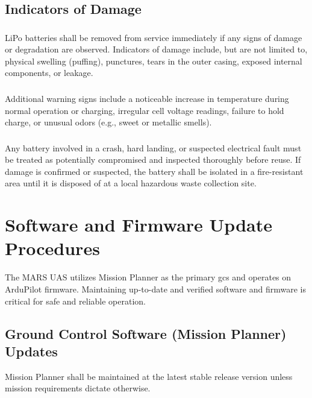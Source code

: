     \subsection{Indicators of Damage}
    \subsubsection{} LiPo batteries shall be removed from service immediately if any signs of damage or degradation are observed. Indicators of damage include, but are not limited to, physical swelling (puffing), punctures, tears in the outer casing, exposed internal components, or leakage.
    
    \subsubsection{} Additional warning signs include a noticeable increase in temperature during normal operation or charging, irregular cell voltage readings, failure to hold charge, or unusual odors (e.g., sweet or metallic smells).
    
    \subsubsection{} Any battery involved in a crash, hard landing, or suspected electrical fault must be treated as potentially compromised and inspected thoroughly before reuse. If damage is confirmed or suspected, the battery shall be isolated in a fire-resistant area until it is disposed of at a local hazardous waste collection site.
    
\section{Software and Firmware Update Procedures}\label{sec:softwaremgmt}
    
    The MARS UAS utilizes Mission Planner as the primary \ac{gcs} and operates on ArduPilot firmware. Maintaining up-to-date and verified software and firmware is critical for safe and reliable operation.
    
    \subsection{Ground Control Software (Mission Planner) Updates}
        
        Mission Planner shall be maintained at the latest stable release version unless mission requirements dictate otherwise. 
        
